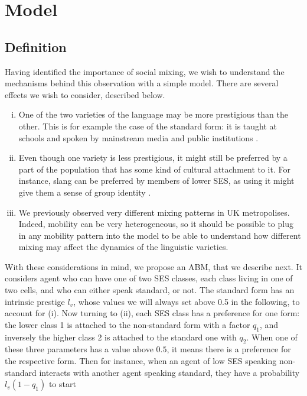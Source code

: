 \documentclass[../thesis.tex]{subfiles}
\begin{document}
\section{Model}

\subsection{Definition}
Having identified the importance of social mixing, we wish to understand the mechanisms
behind this observation with a simple model. There are several effects we wish to
consider, described below.
\begin{enumerate}[(i)]
  \item One of the two varieties of the language may be more prestigious than the other.
  This is for example the case of the standard form: it is taught at schools and spoken
  by mainstream media and public institutions \cite{DavilaInevitabilityStandard2016}.
  \item Even though one variety is less prestigious, it might still be preferred by a
  part of the population that has some kind of cultural attachment to it. For instance,
  slang can be preferred by members of lower \ac{SES}, as using it might give them a
  sense of group identity
  \cite{LabovSocialStratification1966,TrudgillSocialDifferentiation1974}.
  \item We previously observed very different mixing patterns in UK metropolises.
  Indeed, mobility can be very heterogeneous, so it should be possible to plug in any
  mobility pattern into the model to be able to understand how different mixing may
  affect the dynamics of the linguistic varieties.
\end{enumerate}
With these considerations in mind, we propose an \ac{ABM}, that we describe next. It
considers agent who can have one of two \ac{SES} classes, each class living in one of
two cells, and who can either speak standard, or not. The standard form has an intrinsic
prestige $l_v$, whose values we will always set above 0.5 in the following, to account
for (i). Now turning to (ii), each \ac{SES} class has a preference for one form: the
lower class 1 is attached to the non-standard form with a factor $q_1$, and inversely
the higher class 2 is attached to the standard one with $q_2$. When one of these three
parameters has a value above $0.5$, it means there is a preference for the respective
form. Then for instance, when an agent of low \ac{SES} speaking non-standard interacts
with another agent speaking standard, they have a probability $l_v (1 - q_1)$ to start
\end{document}
